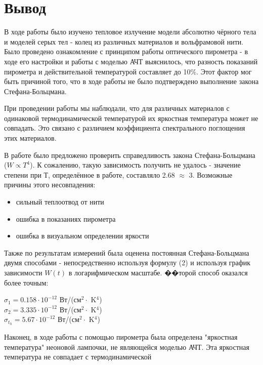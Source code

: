 \section{Вывод}
В ходе работы было изучено тепловое излучение модели абсолютно чёрного тела и моделей серых тел - колец из различных материалов и вольфрамовой нити. Было проведено ознакомление с принципом работы оптического пирометра - в ходе его настройки и работы с моделью АЧТ выяснилось, что разность показаний пирометра и действительной температурой составляет до 10\%. Этот фактор мог быть причиной того, что в ходе работы не было подтверждено выполнение закона Стефана-Больцмана. \par
При проведении работы мы наблюдали, что для различных материалов с одинаковой термодинамической температурой их яркостная температура может не совпадать. Это связано с различием коэффициента спектрального поглощения этих материалов. \par
В работе было предложено проверить справедливость закона Стефана-Больцмана ($W \propto T^4$). К сожалению, такую зависимость получить не удалось - значение степени при Т, определённое в работе, составляло 2.68 $\approx$ 3. Возможные причины этого несовпадения:
\begin{itemize}
    \item сильный теплоотвод от нити
    \item ошибка в показаниях пирометра
    \item ошибка в визуальном определении яркости
\end{itemize}
Также по результатам измерений была оценена постоянная Стефана-Больцмана двумя способами - непосредственно используя формулу (2) и используя график зависимости $W(t)$ в логарифмическом масштабе. ��торой способ оказался более точным:
\begin{center}
    $\sigma_1 = 0.158\cdot 10^{-12}$ Вт/(см$^2 \cdot$ K$^4$) \\
    $\sigma_2 = 3.335 \cdot 10^{-12}$ Вт/(см$^2 \cdot$ K$^4$) \\
    $\sigma_t_h = 5.67\cdot 10^{-12}$ Вт/(см$^2 \cdot$ K$^4$)
\end{center}
Наконец, в ходе работы с помощью пирометра была определена "яркостная температура" неоновой лампочки, не являющейся моделью АЧТ. Эта яркостная температура не совпадает с термодинамической








